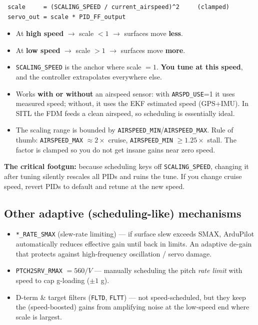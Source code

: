 \documentclass[11pt,a4paper]{article}
\newcommand{\pp}[1]{\texttt{#1}} %
\begin{document}
\begin{lstlisting}
 scale     = (SCALING_SPEED / current_airspeed)^2     (clamped)
 servo_out = scale * PID_FF_output
\end{lstlisting}

\begin{itemize}[leftmargin=1.4em]
  \item At \textbf{high speed} $\rightarrow$ scale $<1$ $\rightarrow$ surfaces move
  \textbf{less}.
  \item At \textbf{low speed} $\rightarrow$ scale $>1$ $\rightarrow$ surfaces move
  \textbf{more}.
  \item \pp{SCALING\_SPEED} is the anchor where scale $=1$. \textbf{You tune at
  this speed}, and the controller extrapolates everywhere else.
  \item Works \textbf{with or without} an airspeed sensor: with \pp{ARSPD\_USE}=1
  it uses measured speed; without, it uses the EKF estimated speed (GPS+IMU). In
  SITL the FDM feeds a clean airspeed, so scheduling is essentially ideal.
  \item The scaling range is bounded by \pp{AIRSPEED\_MIN}/\pp{AIRSPEED\_MAX}.
  Rule of thumb: \pp{AIRSPEED\_MAX} $\approx 2\times$ cruise, \pp{AIRSPEED\_MIN}
  $\geq 1.25\times$ stall. The factor is clamped so you do not get insane gains
  near zero speed.
\end{itemize}

\textbf{The critical footgun:} because scheduling keys off \pp{SCALING\_SPEED},
changing it after tuning silently rescales all PIDs and ruins the tune. If you
change cruise speed, revert PIDs to default and retune at the new speed.

\subsection{Other adaptive (scheduling-like) mechanisms}
\begin{itemize}[leftmargin=1.4em]
  \item \pp{*\_RATE\_SMAX} (slew-rate limiting) --- if surface slew exceeds SMAX,
  ArduPilot automatically reduces effective gain until back in limits. An adaptive
  de-gain that protects against high-frequency oscillation / servo damage.
  \item \pp{PTCH2SRV\_RMAX} $=560/V$ --- manually scheduling the pitch \emph{rate
  limit} with speed to cap g-loading ($\pm 1$ g).
  \item D-term \& target filters (\pp{FLTD}, \pp{FLTT}) --- not speed-scheduled,
  but they keep the (speed-boosted) gains from amplifying noise at the low-speed
  end where scale is largest.
\end{itemize}
\end{document}
